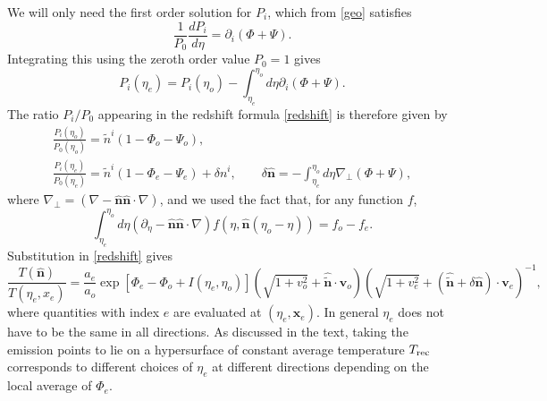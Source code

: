 \documentclass[12pt]{article}
\numberwithin{equation}{section}
\def\bsb{\boldsymbol}
\def\bea{\begin{eqnarray}}
\def\eea{\end{eqnarray}}
\def\be{\begin{equation}}
\def\ee{\end{equation}}
\def\d{\partial}
\def\n{\bsb{\hat n}}
\def\x{{\bsb x}}
\begin{document}
{We will only need the first order solution for $P_i$, which from \eqref{geo} satisfies
\be
\frac{1}{P_0}\frac{dP_i}{d\eta}=\d_i(\Phi+\Psi).
\ee
Integrating this using the zeroth order value $P_0=1$ gives
\be
P_i(\eta_e)=P_i(\eta_o)-\int_{\eta_e}^{\eta_o} d\eta \d_i(\Phi+\Psi).
\ee
The ratio $P_i/P_0$ appearing in the redshift formula \eqref{redshift} is therefore given by
\bea
\frac{P_i(\eta_o)}{P_0(\eta_o)}=  {\tilde n}^i (1-\Phi_o-\Psi_o),~~~~~~~~~~~~~~~~~~~~~~~~~~~~\\
\label{Pi/P0}
\frac{P_i(\eta_e)}{P_0(\eta_e)}=  {\tilde n}^i (1-\Phi_e-\Psi_e)+\delta {n}^i,\qquad 
{\delta \n} = -\int _{\eta_e}^{\eta_o} d\eta \nabla_\perp (\Phi+\Psi),
\eea
where $\nabla_\perp = (\nabla- \n  \n\cdot\nabla)$, and we used the fact that, for any function $f$,
\be
\int_{\eta_e}^{\eta_o} d\eta (\d_\eta - \n \n\cdot \nabla) f(\eta,\n(\eta_o-\eta)) = f_o - f_e.
\ee
Substitution in \eqref{redshift} gives 
\be\label{To/Te}
\frac{T(\bsb{\hat n})}{T(\eta_e,x_e)}= \frac{a_e}{a_o} \exp[\Phi_e-\Phi_o +I(\eta_e,\eta_o)]
\left(\sqrt{1+v_o^2}+\bsb{\hat{\tilde n}}\cdot \bsb v_o\right)
\left(\sqrt{1+v_e^2}+(\bsb{\hat{\tilde n}}+{\delta \bsb{\hat{n}}})\cdot \bsb v_e\right)^{-1}\!\! ,
\ee
where quantities with index $e$ are evaluated at $(\eta_e,\x_e)$. In general $\eta_e$ does not have to be the same in all directions. As discussed in the text, taking the emission points to lie on a hypersurface of constant average temperature $T_{\rm rec}$ corresponds to different choices of $\eta_e$ at different directions depending on the local average of $\Phi_e$. 

}
\end{document}
